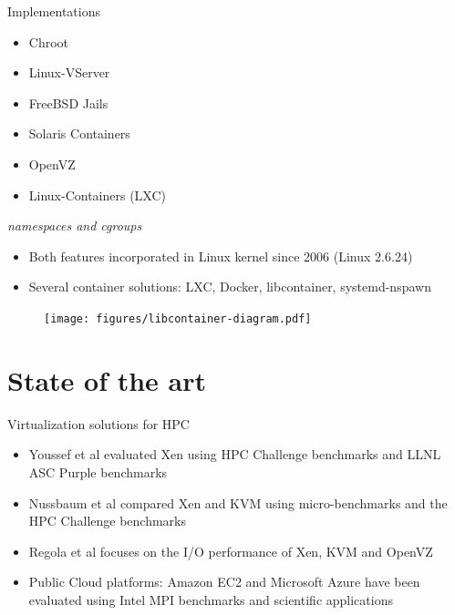 \documentclass[presentation]{beamer}
\begin{document}
\begin{frame}[label=sec-1-2]{Implementations}
\begin{itemize}
\item Chroot
\item Linux-VServer
\item FreeBSD Jails
\item Solaris Containers
\item OpenVZ
\item Linux-Containers (LXC)
\end{itemize}
\end{frame}

\begin{frame}[label=sec-1-3]{\emph{namespaces and cgroups}}
\begin{itemize}
\item Both features incorporated in Linux kernel since 2006 (Linux 2.6.24)
\item Several container solutions: LXC, Docker, libcontainer, systemd-nspawn
\end{itemize}

\begin{figure}[!h]
  \center
\texttt{[image: figures/libcontainer-diagram.pdf]}
  \label{fig:hpc}
\end{figure}
\end{frame}



\section{State of the art}
\label{sec-2}
\begin{frame}[label=sec-2-1]{Virtualization solutions for HPC}
\begin{itemize}
\item Youssef et al\cite{Youseff:2006:EPI:1308175.1308346} evaluated Xen using HPC
Challenge benchmarks and LLNL ASC Purple benchmarks

\item Nussbaum et al\cite{nussbaum2009linux} compared Xen and KVM using
micro-benchmarks and the HPC Challenge benchmarks

\item Regola et al\cite{regola2010recommendations} focuses on the I/O
performance of Xen, KVM and OpenVZ

\item Public Cloud platforms: Amazon EC2 \cite{5353067} and Microsoft Azure\cite{Tudoran:2012:PEA:2168697.2168701}
  have been evaluated using Intel MPI benchmarks and scientific applications
\end{itemize}
\end{frame}
\end{document}
